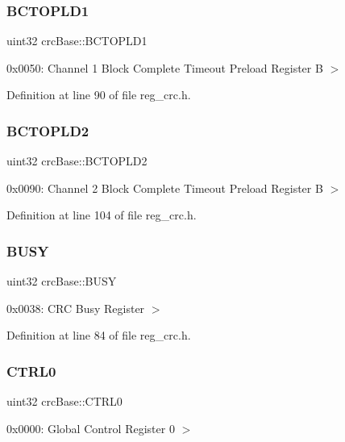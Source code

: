 \subsubsection{\texorpdfstring{B\+C\+T\+O\+P\+L\+D1}{BCTOPLD1}}
{\footnotesize\ttfamily uint32 crc\+Base\+::\+B\+C\+T\+O\+P\+L\+D1}

0x0050\+: Channel 1 Block Complete Timeout Preload Register B $>$ 

Definition at line 90 of file reg\+\_\+crc.\+h.

\mbox{\label{structcrcBase_a4de1ad869ff7b92f3a65a81c657d72fa}} 
\subsubsection{\texorpdfstring{B\+C\+T\+O\+P\+L\+D2}{BCTOPLD2}}
{\footnotesize\ttfamily uint32 crc\+Base\+::\+B\+C\+T\+O\+P\+L\+D2}

0x0090\+: Channel 2 Block Complete Timeout Preload Register B $>$ 

Definition at line 104 of file reg\+\_\+crc.\+h.

\mbox{\label{structcrcBase_a8edcf649571f9813f48a79602a3915dc}} 
\subsubsection{\texorpdfstring{B\+U\+SY}{BUSY}}
{\footnotesize\ttfamily uint32 crc\+Base\+::\+B\+U\+SY}

0x0038\+: C\+RC Busy Register $>$ 

Definition at line 84 of file reg\+\_\+crc.\+h.

\mbox{\label{structcrcBase_a797eadcec3496b227d91dac1f1c55fb1}} 
\subsubsection{\texorpdfstring{C\+T\+R\+L0}{CTRL0}}
{\footnotesize\ttfamily uint32 crc\+Base\+::\+C\+T\+R\+L0}

0x0000\+: Global Control Register 0 $>$ 

